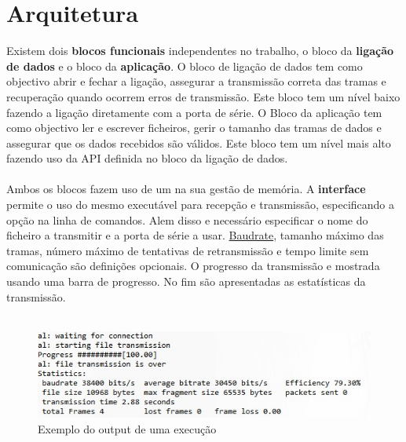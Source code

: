 \documentclass[11pt]{article}
\begin{document}
\newpage
\thispagestyle{fancy}
\fancyhf{}
\fancyfoot[R]{\thepage}
\renewcommand*{\footrulewidth}{1pt}

\section*{Arquitetura}
Existem dois \textbf{blocos funcionais} independentes no trabalho, o bloco da \textbf{ligação de dados} e o bloco da \textbf{aplicação}. O bloco de ligação de dados tem como objectivo abrir e fechar a ligação, assegurar a transmissão correta das tramas e recuperação quando ocorrem erros de transmissão. Este bloco tem um nível baixo fazendo a ligação diretamente com a porta de série.
\newline
\newline
O Bloco da aplicação tem como objectivo ler e escrever ficheiros, gerir o tamanho das tramas de dados e assegurar que os dados recebidos são válidos. Este bloco tem um nível mais alto fazendo uso da API definida no bloco da ligação de dados.\\\\
Ambos os blocos fazem uso de um \textbf{} na sua gestão de memória.
\newline
\newline
A \textbf{interface} permite o uso do mesmo executável para recepção e transmissão, especificando a opção na linha de comandos. Alem disso e necessário especificar o nome do ficheiro a transmitir e a porta de série a usar. \underline{Baudrate}, tamanho máximo das tramas, número máximo de tentativas de retransmissão e tempo limite sem comunicação são definições opcionais. O progresso da transmissão e mostrada usando uma barra de progresso. No fim são apresentadas as estatísticas da transmissão.\\\\
\begin{figure}[!ht]
\includegraphics[scale=1]{INTERFACE.jpg}
\caption{\scriptsize Exemplo do output de uma execução}
\end{figure}

\newpage
\thispagestyle{fancy}
\fancyhf{}
\fancyfoot[R]{\thepage}
\renewcommand*{\footrulewidth}{1pt}
\end{document}
